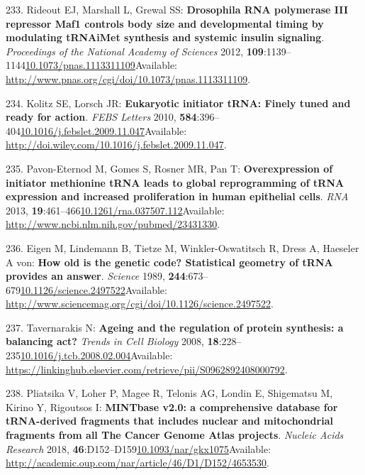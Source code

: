 \documentclass[
]{book}
\begin{document}
\leavevmode\hypertarget{ref-Rideout2012}{}%
233. Rideout EJ, Marshall L, Grewal SS: \textbf{Drosophila RNA polymerase III repressor Maf1 controls body size and developmental timing by modulating tRNAiMet synthesis and systemic insulin signaling}. \emph{Proceedings of the National Academy of Sciences} 2012, \textbf{109}:1139--1144\href{https://doi.org/10.1073/pnas.1113311109}{10.1073/pnas.1113311109}Available: \url{http://www.pnas.org/cgi/doi/10.1073/pnas.1113311109}.

\leavevmode\hypertarget{ref-Kolitz2010}{}%
234. Kolitz SE, Lorsch JR: \textbf{Eukaryotic initiator tRNA: Finely tuned and ready for action}. \emph{FEBS Letters} 2010, \textbf{584}:396--404\href{https://doi.org/10.1016/j.febslet.2009.11.047}{10.1016/j.febslet.2009.11.047}Available: \url{http://doi.wiley.com/10.1016/j.febslet.2009.11.047}.

\leavevmode\hypertarget{ref-Pavon-Eternod2013}{}%
235. Pavon-Eternod M, Gomes S, Rosner MR, Pan T: \textbf{Overexpression of initiator methionine tRNA leads to global reprogramming of tRNA expression and increased proliferation in human epithelial cells}. \emph{RNA} 2013, \textbf{19}:461--466\href{https://doi.org/10.1261/rna.037507.112}{10.1261/rna.037507.112}Available: \url{http://www.ncbi.nlm.nih.gov/pubmed/23431330}.

\leavevmode\hypertarget{ref-Eigen1989}{}%
236. Eigen M, Lindemann B, Tietze M, Winkler-Oswatitsch R, Dress A, Haeseler A von: \textbf{How old is the genetic code? Statistical geometry of tRNA provides an answer}. \emph{Science} 1989, \textbf{244}:673--679\href{https://doi.org/10.1126/science.2497522}{10.1126/science.2497522}Available: \url{http://www.sciencemag.org/cgi/doi/10.1126/science.2497522}.

\leavevmode\hypertarget{ref-Tavernarakis2008}{}%
237. Tavernarakis N: \textbf{Ageing and the regulation of protein synthesis: a balancing act?} \emph{Trends in Cell Biology} 2008, \textbf{18}:228--235\href{https://doi.org/10.1016/j.tcb.2008.02.004}{10.1016/j.tcb.2008.02.004}Available: \url{https://linkinghub.elsevier.com/retrieve/pii/S0962892408000792}.

\leavevmode\hypertarget{ref-Pliatsika2018}{}%
238. Pliatsika V, Loher P, Magee R, Telonis AG, Londin E, Shigematsu M, Kirino Y, Rigoutsos I: \textbf{MINTbase v2.0: a comprehensive database for tRNA-derived fragments that includes nuclear and mitochondrial fragments from all The Cancer Genome Atlas projects}. \emph{Nucleic Acids Research} 2018, \textbf{46}:D152--D159\href{https://doi.org/10.1093/nar/gkx1075}{10.1093/nar/gkx1075}Available: \url{http://academic.oup.com/nar/article/46/D1/D152/4653530}.
\end{document}
